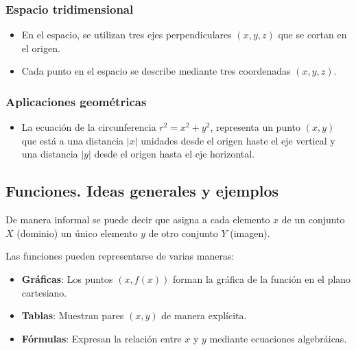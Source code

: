 \subsubsection*{Espacio tridimensional}
\begin{itemize}
    \item En el espacio, se utilizan tres ejes perpendiculares $(x, y, z)$ que se cortan en el origen.
    \item Cada punto en el espacio se describe mediante tres coordenadas $(x, y, z)$.
\end{itemize}

\subsubsection*{Aplicaciones geométricas}
\begin{itemize}
    \item La ecuación de la circunferencia $r^2 = x^2 + y^2$, representa un punto $(x, y)$ que está a una distancia $|x|$ unidades desde el origen haste el eje vertical y una distancia $|y|$ desde el origen hasta el eje horizontal.
\end{itemize}

\subsection*{Funciones. Ideas generales y ejemplos}

De manera informal se puede decir que asigna a cada elemento $x$ de un conjunto $X$ (dominio) un único elemento $y$ de otro conjunto $Y$ (imagen).

Las funciones pueden representarse de varias maneras:
\begin{itemize}
    \item \textbf{Gráficas}: Los puntos $(x, f(x))$ forman la gráfica de la función en el plano cartesiano.
    \item \textbf{Tablas}: Muestran pares $(x, y)$ de manera explícita.
    \item \textbf{Fórmulas}: Expresan la relación entre $x$ y $y$ mediante ecuaciones algebráicas.
\end{itemize}

